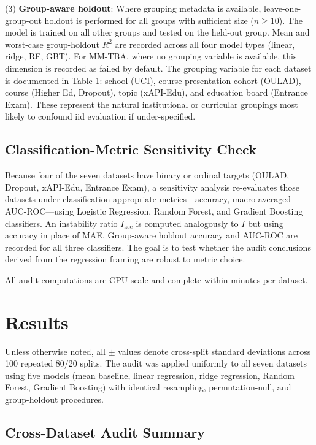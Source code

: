 (3) \textbf{Group-aware holdout}: Where grouping metadata is available, leave-one-group-out holdout is performed for all groups with sufficient size ($n \geq 10$). The model is trained on all other groups and tested on the held-out group. Mean and worst-case group-holdout $R^2$ are recorded across all four model types (linear, ridge, RF, GBT). For MM-TBA, where no grouping variable is available, this dimension is recorded as failed by default. The grouping variable for each dataset is documented in Table 1: school (UCI), course-presentation cohort (OULAD), course (Higher Ed, Dropout), topic (xAPI-Edu), and education board (Entrance Exam). These represent the natural institutional or curricular groupings most likely to confound iid evaluation if under-specified.

\subsection{Classification-Metric Sensitivity Check}
Because four of the seven datasets have binary or ordinal targets (OULAD, Dropout, xAPI-Edu, Entrance Exam), a sensitivity analysis re-evaluates those datasets under classification-appropriate metrics---accuracy, macro-averaged AUC-ROC---using Logistic Regression, Random Forest, and Gradient Boosting classifiers. An instability ratio $I_{\mathrm{acc}}$ is computed analogously to $I$ but using accuracy in place of MAE. Group-aware holdout accuracy and AUC-ROC are recorded for all three classifiers. The goal is to test whether the audit conclusions derived from the regression framing are robust to metric choice.

All audit computations are CPU-scale and complete within minutes per dataset.

\section{Results}

Unless otherwise noted, all $\pm$ values denote cross-split standard deviations across 100 repeated 80/20 splits. The audit was applied uniformly to all seven datasets using five models (mean baseline, linear regression, ridge regression, Random Forest, Gradient Boosting) with identical resampling, permutation-null, and group-holdout procedures.

\subsection{Cross-Dataset Audit Summary}

